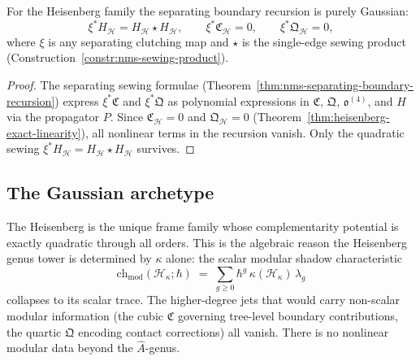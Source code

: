 \begin{corollary}
\label{cor:heisenberg-gaussian-boundary}
For the Heisenberg family the separating boundary recursion is purely
Gaussian:
\begin{equation}\label{eq:heisenberg-gaussian-boundary}
\xi^*H_{\mathcal{H}}
= H_{\mathcal{H}} \star H_{\mathcal{H}},
\qquad
\xi^*\mathfrak{C}_{\mathcal{H}} = 0,
\qquad
\xi^*\mathfrak{Q}_{\mathcal{H}} = 0,
\end{equation}
where $\xi$ is any separating clutching map and $\star$ is the
single-edge sewing product
(Construction~\ref{constr:nms-sewing-product}).
\end{corollary}

\begin{proof}
The separating sewing formulae
(Theorem~\ref{thm:nms-separating-boundary-recursion}) express
$\xi^*\mathfrak{C}$ and $\xi^*\mathfrak{Q}$ as polynomial
expressions in $\mathfrak{C}$, $\mathfrak{Q}$,
$\mathfrak{o}^{(4)}$, and $H$ via the propagator $P$. Since
$\mathfrak{C}_{\mathcal{H}} = 0$ and
$\mathfrak{Q}_{\mathcal{H}} = 0$
(Theorem~\ref{thm:heisenberg-exact-linearity}),
all nonlinear terms in the recursion vanish. Only the quadratic
sewing $\xi^*H_{\mathcal{H}} = H_{\mathcal{H}} \star H_{\mathcal{H}}$
survives.
\end{proof}

\subsection{The Gaussian archetype}
\label{subsec:heisenberg-gaussian-archetype}

\begin{remark}
\label{rem:heisenberg-exact-gaussianity}
The Heisenberg is the unique frame family whose complementarity
potential is exactly quadratic through all orders. This is the
algebraic reason the Heisenberg genus tower
is determined by $\kappa$ alone: the scalar modular shadow
characteristic
\[
\mathrm{ch}_{\mathrm{mod}}(\mathcal{H}_\kappa;\hbar)
\;=\;
\sum_{g \ge 0} \hbar^g\,\kappa(\mathcal{H}_\kappa)\,\lambda_g
\]
collapses to its scalar trace. The higher-degree jets that would
carry non-scalar modular information (the cubic $\mathfrak{C}$
governing tree-level boundary contributions, the quartic
$\mathfrak{Q}$ encoding contact corrections) all vanish.
There is no nonlinear modular data beyond the $\hat{A}$-genus.
\end{remark}

